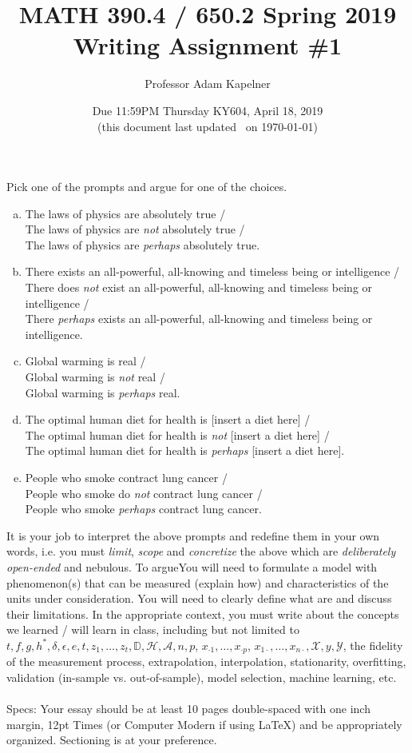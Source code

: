 \documentclass[12pt]{article}
\title{MATH 390.4 / 650.2 Spring 2019 \\ Writing Assignment \#1}
\author{Professor Adam Kapelner} %
\date{Due 11:59PM Thursday KY604, April 18, 2019 \\ \vspace{0.5cm} \small (this document last updated \currenttime~on \today)}
\begin{document}
\maketitle

\noindent Pick one of the prompts and argue for one of the choices. 

\begin{enumerate}[(a)]
\item The laws of physics are absolutely true / \\
The laws of physics are \textit{not} absolutely true / \\
The laws of physics are \textit{perhaps} absolutely true.
\item There exists an all-powerful, all-knowing and timeless being or intelligence / \\
There does \textit{not} exist an all-powerful, all-knowing and timeless being or intelligence / \\
There \textit{perhaps} exists an all-powerful, all-knowing and timeless being or intelligence.
\item Global warming is real / \\
Global warming is \textit{not} real / \\
Global warming is \textit{perhaps} real.
\item The optimal human diet for health is [insert a diet here] / \\
The optimal human diet for health is \textit{not} [insert a diet here] / \\
The optimal human diet for health is \textit{perhaps} [insert a diet here].
\item People who smoke contract lung cancer / \\
People who smoke do \textit{not} contract lung cancer / \\
People who smoke \textit{perhaps} contract lung cancer.
\end{enumerate}

\noindent It is your job to interpret the above prompts and redefine them in your own words, i.e. you must \textit{limit}, \textit{scope} and \textit{concretize} the above which are \textit{deliberately open-ended} and nebulous. To argueYou will need to formulate a model with phenomenon(s) that can be measured (explain how) and characteristics of the units under consideration. You will need to clearly define what  are and discuss their limitations. In the appropriate context, you must write about the concepts we learned / will learn in class, including but not limited to $t ,f, g, h^*, \delta, \epsilon, e, t, z_1, \ldots, z_t, \mathbb{D}, \mathcal{H}, \mathcal{A}, n, p$, $x_{\cdot 1}, \ldots, x_{\cdot p}$, $x_{1 \cdot}, \ldots, x_{n \cdot}, \mathcal{X}, y, \mathcal{Y}$, the fidelity of the measurement process, extrapolation, interpolation, stationarity, overfitting, validation (in-sample vs. out-of-sample), model selection, machine learning, etc. \\
~\\
Specs: Your essay should be at least 10 pages double-spaced with one inch margin, 12pt Times (or Computer Modern if using \LaTeX) and be appropriately organized. Sectioning is at your preference.

\end{document}

